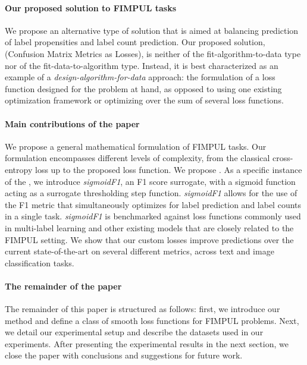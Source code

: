 \paragraph{Our proposed solution to FIMPUL tasks}
We propose an alternative type of solution that is aimed at balancing prediction of label propensities and label count prediction. Our proposed solution, \solution (Confusion Matrix Metrics as Losses), is neither of the fit-algorithm-to-data type nor of the fit-data-to-algorithm type. 
Instead, it is best characterized as an example of a \emph{design-algorithm-for-data} approach: the formulation of a loss function designed for the problem at hand, as opposed to using one existing optimization framework or optimizing over the sum of several loss functions.

\paragraph{Main contributions of the paper}
We propose a general mathematical formulation of FIMPUL tasks. 
Our formulation encompasses different levels of complexity, from the classical cross-entropy loss up to the proposed loss function. We propose \solution. As a specific instance of the \solution, we introduce \emph{sigmoidF1}, an F1 score surrogate, with a sigmoid function acting as a surrogate thresholding step function. 
\emph{sigmoidF1} allows for the use of the F1 metric that simultaneously optimizes for label prediction and label counts in a single task.  
\emph{sigmoidF1} is benchmarked against loss functions commonly used in multi-label learning and other existing models that are closely related to the FIMPUL setting. We show that our custom losses improve predictions over the current state-of-the-art on several different metrics, across text and image classification tasks. 

\paragraph{The remainder of the paper}
The remainder of this paper is structured as follows: first, we introduce our method and define a class of smooth loss functions for FIMPUL problems. Next, we detail our experimental setup and describe the datasets used in our experiments. After presenting the experimental results in the next section, we close the paper with conclusions and suggestions for future work.




